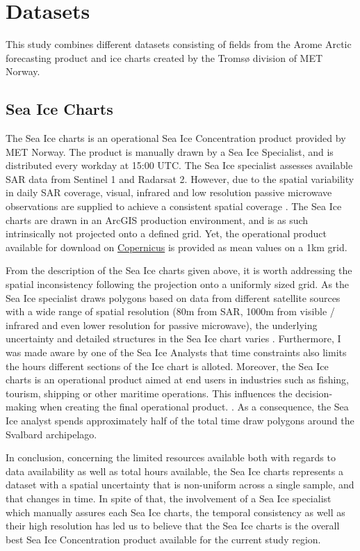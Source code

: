 \documentclass[../main/thesis.tex]{subfiles}
\begin{document}
\section{Datasets}
This study combines different datasets consisting of fields from the Arome Arctic forecasting product and ice charts created by the Tromsø division of MET Norway.

\subsection{Sea Ice Charts}
The Sea Ice charts is an operational Sea Ice Concentration product provided by MET Norway. The product is manually drawn by a Sea Ice Specialist, and is distributed every workday at 15:00 UTC. The Sea Ice specialist assesses available SAR data from Sentinel 1 and Radarsat 2. However, due to the spatial variability in daily SAR coverage, visual, infrared and low resolution passive microwave observations are supplied to achieve a consistent spatial coverage \cite{MOI2015}. The Sea Ice charts are drawn in an ArcGIS production environment, and is as such intrinsically not projected onto a defined grid. Yet, the operational product available for download on \href{https://resources.marine.copernicus.eu/product-detail/SEAICE_ARC_SEAICE_L4_NRT_OBSERVATIONS_011_002/INFORMATION}{Copernicus} is provided as mean values on a 1km grid.

From the description of the Sea Ice charts given above, it is worth addressing the spatial inconsistency following the projection onto a uniformly sized grid. As the Sea Ice specialist draws polygons based on data from different satellite sources with a wide range of spatial resolution (80m from SAR, 1000m from visible / infrared and even lower resolution for passive microwave), the underlying uncertainty and detailed structures in the Sea Ice chart varies \cite{MOI2015}. Furthermore, I was made aware by one of the Sea Ice Analysts that time constraints also limits the hours different sections of the Ice chart is alloted. Moreover, the Sea Ice charts is an operational product aimed at end users in industries such as fishing, tourism, shipping or other maritime operations. This influences the decision-making when creating the final operational product. . As a consequence, the Sea Ice analyst spends approximately half of the total time draw polygons around the Svalbard archipelago. 

In conclusion, concerning the limited resources available both with regards to data availability as well as total hours available, the Sea Ice charts represents a dataset with a spatial uncertainty that is non-uniform across a single sample, and that changes in time. In spite of that, the involvement of a Sea Ice specialist which manually assures each Sea Ice charts, the temporal consistency as well as their high resolution has led us to believe that the Sea Ice charts is the overall best Sea Ice Concentration product available for the current study region.
\end{document}
